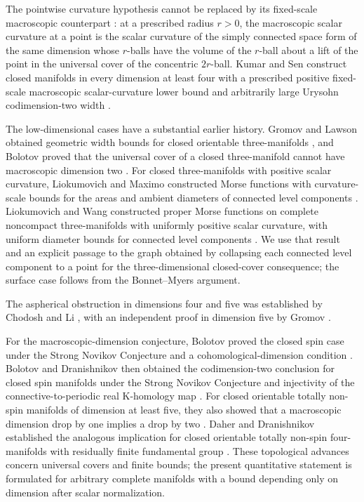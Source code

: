 The pointwise curvature hypothesis cannot be replaced by its fixed-scale
macroscopic counterpart \citep[Definition~1.3]{kumarSen2026Width}: at a
prescribed radius \(r>0\), the macroscopic scalar curvature at a point is
the scalar curvature of the simply connected space form of the same
dimension whose \(r\)-balls have the volume of the \(r\)-ball about a lift
of the point in the universal cover of the concentric \(2r\)-ball. Kumar and Sen
construct closed manifolds in
every dimension at least four with a prescribed positive fixed-scale
macroscopic scalar-curvature lower bound and arbitrarily large
Urysohn codimension-two width \citep[Theorem~A]{kumarSen2026Width}.

The low-dimensional cases have a substantial earlier history.
Gromov and Lawson obtained geometric width bounds for closed orientable
three-manifolds \citep[Corollary~10.11]{gromovLawson1983}, and Bolotov proved that the
universal cover of a closed three-manifold cannot have macroscopic
dimension two \citep{bolotov2003}.
For closed three-manifolds with positive scalar curvature, Liokumovich
and Maximo constructed Morse functions with curvature-scale bounds for
the areas and ambient diameters of connected level components
\citep[Theorem~1.1]{liokumovichMaximo2023}.
Liokumovich and Wang constructed proper Morse functions on
complete noncompact three-manifolds with uniformly positive scalar
curvature, with uniform diameter bounds for connected level components
\citep[Theorem~1.1]{liokumovichWang2023}.
We use that result and an explicit passage to the graph obtained by collapsing each connected level component to a point for the
three-dimensional closed-cover consequence; the surface case follows
from the Bonnet--Myers argument.

The aspherical obstruction in dimensions four and five was established
by Chodosh and Li \citep[Theorem~2]{chodoshLi}, with an independent
proof in dimension five by Gromov
\citep[\S7, Main Corollary]{gromov2020Aspherical}.

For the macroscopic-dimension conjecture, Bolotov proved the closed spin
case under the Strong Novikov Conjecture and a cohomological-dimension condition
\citep{bolotov2009}. Bolotov and Dranishnikov then obtained the
codimension-two conclusion for closed spin manifolds under the
Strong Novikov Conjecture and
injectivity of the connective-to-periodic real K-homology map
\citep[Theorem~4.3]{bolotovDranishnikov2010}.
For closed orientable totally non-spin manifolds of dimension at least
five, they also showed that a macroscopic dimension drop by one implies
a drop by two \citep[Theorem~3.4]{bolotovDranishnikov2016}.
Daher and Dranishnikov established the analogous implication for closed
orientable totally non-spin four-manifolds with residually finite
fundamental group
\citep[Theorem~3.3]{daherDranishnikov2019}.
These topological advances concern universal covers and finite bounds;
the present quantitative statement is formulated for arbitrary complete
manifolds with a bound depending only on dimension after scalar normalization.


